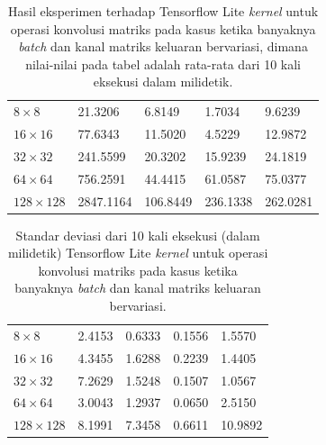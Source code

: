 \begin{table}
	\centering
	\caption{Hasil eksperimen terhadap Tensorflow Lite \textit{kernel} untuk operasi konvolusi matriks pada kasus ketika banyaknya \textit{batch} dan kanal matriks keluaran bervariasi, dimana nilai-nilai pada tabel adalah rata-rata dari 10 kali eksekusi dalam milidetik.}
	\label{tab:convvarbchnspeed}
\begin{tabular}{|>{\small}R{2.5cm}|>{\small}R{2.1cm}|>{\small}R{2.1cm}|>{\small}R{2.1cm}|>{\small}R{2.4cm}|}
	\hline
	 & 
	 & 
	 & 
	 & 
	 \\
	\hline
		$8 \times 8$ & 21.3206 & 6.8149 & 1.7034 & 9.6239
		\\
		\hline
		$16 \times 16$ & 77.6343 & 11.5020 & 4.5229 & 12.9872
		\\
		\hline
		$32 \times 32$ & 241.5599 & 20.3202 & 15.9239 & 24.1819
		\\
		\hline
		$64 \times 64$ & 756.2591 & 44.4415 & 61.0587 & 75.0377
		\\
		\hline
		$128 \times 128$ & 2847.1164 & 106.8449 & 236.1338 & 262.0281
		\\
		\hline
	\end{tabular}
\end{table}

\begin{table}
	\centering
	\caption{Standar deviasi dari 10 kali eksekusi (dalam milidetik) Tensorflow Lite \textit{kernel} untuk operasi konvolusi matriks pada kasus ketika banyaknya \textit{batch} dan kanal matriks keluaran bervariasi.}
	\label{tab:convvarbchndev}
\begin{tabular}{|>{\small}R{2.5cm}|>{\small}R{2.1cm}|>{\small}R{2.1cm}|>{\small}R{2.1cm}|>{\small}R{2.4cm}|}
	\hline
	 & 
	 & 
	 & 
	 & 
	 \\
	\hline
		$8 \times 8$ & 2.4153 & 0.6333 & 0.1556 & 1.5570
		\\
		\hline
		$16 \times 16$ & 4.3455 & 1.6288 & 0.2239 & 1.4405
		\\
		\hline
		$32 \times 32$ & 7.2629 & 1.5248 & 0.1507 & 1.0567
		\\
		\hline
		$64 \times 64$ & 3.0043 & 1.2937 & 0.0650 & 2.5150
		\\
		\hline
		$128 \times 128$ & 8.1991 & 7.3458 & 0.6611 & 10.9892
		\\
		\hline
	\end{tabular}
\end{table}

